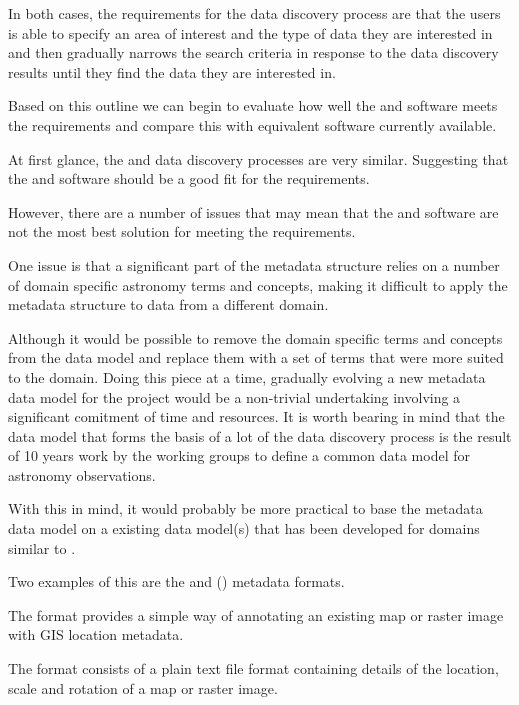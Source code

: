 \documentclass{article}
\begin{document}
In both cases, the requirements for the data discovery process are that the users is able to specify
an area of interest and the type of data they are interested in and then gradually narrows the search
criteria in response to the data discovery results until they find the data they are interested in.

Based on this outline we can begin to evaluate how well the \cite{ivoa} and \cite{astro} software
meets the \cite{trop} requirements and compare this with equivalent \cite{gis} software
currently available.

At first glance, the \cite{ivoa} and \cite{trop} data discovery processes are very similar.
Suggesting that the \cite{ivoa} and \cite{astro} software should be a good fit for the \cite{trop}
requirements.

However, there are a number of issues that may mean that the \cite{ivoa} and \cite{astro} software
are not the most best solution for meeting the \cite{trop} requirements.

One issue is that a significant part of the \cite{ivoa} metadata structure relies on a number of
domain specific astronomy terms and concepts, making it difficult to apply the \cite{ivoa}
metadata structure to data from a different domain.

Although it would be possible to remove the domain specific terms and concepts from
the \cite{ivoa} data model and replace them with a set of terms that were more suited to the
\cite{trop} domain.
Doing this piece at a time, gradually evolving a new metadata data model for the
\cite{trop} project would be a non-trivial undertaking involving a significant
comitment of time and resources.
It is worth bearing in mind that the \cite{ivoa} \cite{ivoa.obscore} data model
that forms the basis of a lot of the \cite{ivoa} data discovery process
is the result of 10 years work by the \cite{ivoa} working groups
to define a common data model for astronomy observations.

With this in mind, it would probably be more practical to base the \cite{trop} metadata
data model on a existing data model(s) that has been developed for domains similar to
\cite{trop}.

Two examples of this are the  and  (\cite{eml})
metadata formats.

The  format provides a simple way of annotating an existing map
or raster image with GIS location metadata.

The \cite{format-world} format consists of a plain text file format containing details of
the location, scale and rotation of a map or raster image.
\end{document}
